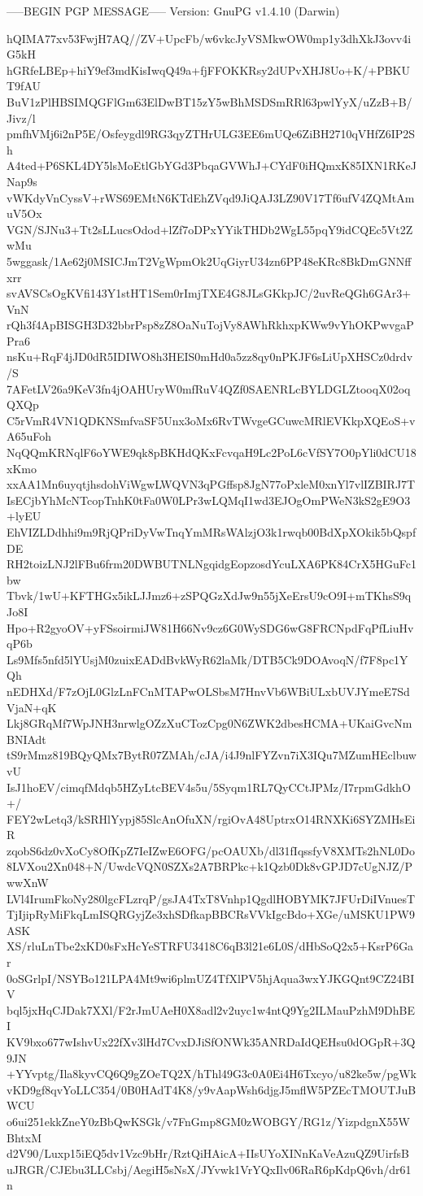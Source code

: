 -----BEGIN PGP MESSAGE-----
Version: GnuPG v1.4.10 (Darwin)

hQIMA77xv53FwjH7AQ//ZV+UpcFb/w6vkcJyVSMkwOW0mp1y3dhXkJ3ovv4iG5kH
hGRfeLBEp+hiY9ef3mdKisIwqQ49a+fjFFOKKRsy2dUPvXHJ8Uo+K/+PBKUT9fAU
BuV1zPlHBSIMQGFlGm63ElDwBT15zY5wBhMSDSmRRl63pwlYyX/uZzB+B/Jivz/l
pmfhVMj6i2nP5E/Osfeygdl9RG3qyZTHrULG3EE6mUQe6ZiBH2710qVHfZ6IP2Sh
A4ted+P6SKL4DY5lsMoEtlGbYGd3PbqaGVWhJ+CYdF0iHQmxK85IXN1RKeJNap9s
vWKdyVnCyssV+rWS69EMtN6KTdEhZVqd9JiQAJ3LZ90V17Tf6ufV4ZQMtAmuV5Ox
VGN/SJNu3+Tt2sLLucsOdod+lZf7oDPxYYikTHDb2WgL55pqY9idCQEc5Vt2ZwMu
5wggask/1Ae62j0MSICJmT2VgWpmOk2UqGiyrU34zn6PP48eKRc8BkDmGNNffxrr
svAVSCsOgKVfi143Y1stHT1Sem0rImjTXE4G8JLsGKkpJC/2uvReQGh6GAr3+VnN
rQh3f4ApBISGH3D32bbrPsp8zZ8OaNuTojVy8AWhRkhxpKWw9vYhOKPwvgaPPra6
nsKu+RqF4jJD0dR5IDIWO8h3HEIS0mHd0a5zz8qy0nPKJF6sLiUpXHSCz0drdv/S
7AFetLV26a9KeV3fn4jOAHUryW0mfRuV4QZf0SAENRLcBYLDGLZtooqX02oqQXQp
C5rVmR4VN1QDKNSmfvaSF5Unx3oMx6RvTWvgeGCuwcMRlEVKkpXQEoS+vA65uFoh
NqQQmKRNqlF6oYWE9qk8pBKHdQKxFcvqaH9Lc2PoL6cVfSY7O0pYli0dCU18xKmo
xxAA1Mn6uyqtjhsdohViWgwLWQVN3qPGffsp8JgN77oPxleM0xnYl7vlIZBIRJ7T
IsECjbYhMcNTcopTnhK0tFa0W0LPr3wLQMqI1wd3EJOgOmPWeN3kS2gE9O3+lyEU
EhVIZLDdhhi9m9RjQPriDyVwTnqYmMRsWAlzjO3k1rwqb00BdXpXOkik5bQspfDE
RH2toizLNJ2lFBu6frm20DWBUTNLNgqidgEopzosdYcuLXA6PK84CrX5HGuFc1bw
Tbvk/1wU+KFTHGx5ikLJJmz6+zSPQGzXdJw9n55jXeErsU9cO9I+mTKhsS9qJo8I
Hpo+R2gyoOV+yFSsoirmiJW81H66Nv9cz6G0WySDG6wG8FRCNpdFqPfLiuHvqP6b
Ls9Mfs5nfd5lYUsjM0zuixEADdBvkWyR62laMk/DTB5Ck9DOAvoqN/f7F8pc1YQh
nEDHXd/F7zOjL0GlzLnFCnMTAPwOLSbsM7HnvVb6WBiULxbUVJYmeE7SdVjaN+qK
Lkj8GRqMf7WpJNH3nrwlgOZzXuCTozCpg0N6ZWK2dbesHCMA+UKaiGvcNmBNIAdt
tS9rMmz819BQyQMx7BytR07ZMAh/cJA/i4J9nlFYZvn7iX3IQu7MZumHEclbuwvU
IsJ1hoEV/cimqfMdqb5HZyLtcBEV4s5u/5Syqm1RL7QyCCtJPMz/I7rpmGdkhO+/
FEY2wLetq3/kSRHlYypj85SlcAnOfuXN/rgiOvA48UptrxO14RNXKi6SYZMHsEiR
zqobS6dz0vXoCy8OfKpZ7IeIZwE6OFG/pcOAUXb/dl31fIqssfyV8XMTs2hNL0Do
8LVXou2Xn048+N/UwdcVQN0SZXs2A7BRPkc+k1Qzb0Dk8vGPJD7cUgNJZ/PwwXnW
LVl4IrumFkoNy280lgcFLzrqP/gsJA4TxT8Vnhp1QgdlHOBYMK7JFUrDiIVnuesT
TjIjipRyMiFkqLmISQRGyjZe3xhSDfkapBBCRsVVkIgcBdo+XGe/uMSKU1PW9ASK
XS/rluLnTbe2xKD0sFxHcYeSTRFU3418C6qB3l21e6L0S/dHbSoQ2x5+KsrP6Gar
0oSGrlpI/NSYBo121LPA4Mt9wi6plmUZ4TfXlPV5hjAqua3wxYJKGQnt9CZ24BIV
bql5jxHqCJDak7XXl/F2rJmUAeH0X8adl2v2uyc1w4ntQ9Yg2ILMauPzhM9DhBEI
KV9bxo677wIshvUx22fXv3lHd7CvxDJiSfONWk35ANRDaIdQEHsu0dOGpR+3Q9JN
+YYvptg/Ila8kyvCQ6Q9gZOeTQ2X/hThl49G3c0A0Ei4H6Txcyo/u82ke5w/pgWk
vKD9gf8qvYoLLC354/0B0HAdT4K8/y9vAapWsh6djgJ5mflW5PZEcTMOUTJuBWCU
o6ui251ekkZneY0zBbQwKSGk/v7FnGmp8GM0zWOBGY/RG1z/YizpdgnX55WBhtxM
d2V90/Luxp15iEQ5dv1Vzc9bHr/RztQiHAicA+IIsUYoXINnKaVeAzuQZ9UirfsB
uJRGR/CJEbu3LLCsbj/AegiH5sNsX/JYvwk1VrYQxIlv06RaR6pKdpQ6vh/dr61n
